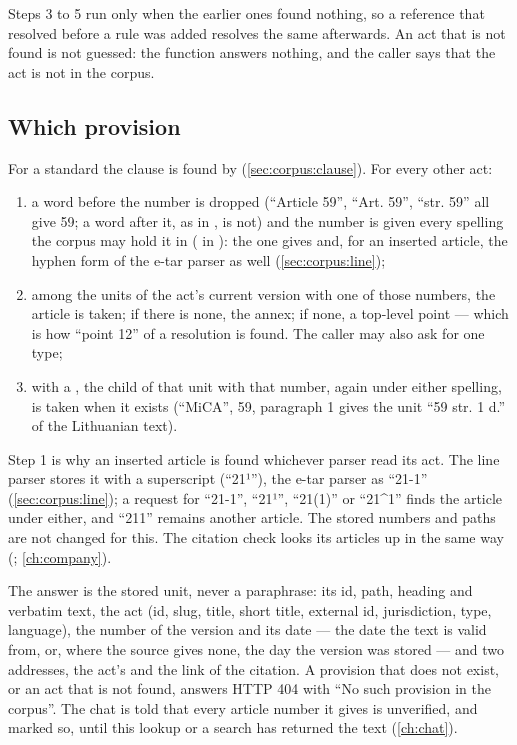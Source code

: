 Steps 3 to 5 run only when the earlier ones found nothing, so a reference that resolved
before a rule was added resolves the same afterwards. An act that is not found is not
guessed: the function answers nothing, and the caller says that the act is not in the corpus.

\subsection{Which provision}\label{sec:corpus:whichprovision}

For a standard the clause is found by  (\cref{sec:corpus:clause}). For
every other act:

\begin{enumerate}
  \item a word before the number is dropped (\enquote{Article 59}, \enquote{Art. 59},
    \enquote{str. 59} all give 59; a word after it, as in , is not) and the
    number is given every spelling the corpus may hold it in ( in
    ): the one  gives and, for an inserted
    article, the hyphen form of the e-tar parser as well (\cref{sec:corpus:line});
  \item among the units of the act's current version with one of those numbers, the article is
    taken; if there is none, the annex; if none, a top-level point --- which is how
    \enquote{point 12} of a resolution is found. The caller may also ask for one type;
  \item with a , the child of that unit with that number, again under either
    spelling, is taken when it
    exists (\enquote{MiCA}, 59, paragraph 1 gives the unit \enquote{59 str. 1 d.} of the
    Lithuanian text).
\end{enumerate}

Step 1 is why an inserted article is found whichever parser read its act. The line parser
stores it with a superscript (\enquote{21¹}), the e-tar parser as \enquote{21-1}
(\cref{sec:corpus:line}); a request for \enquote{21-1}, \enquote{21¹}, \enquote{21(1)} or
\enquote{21\textasciicircum 1} finds the article under either, and \enquote{211} remains
another article. The stored numbers and paths are not changed for this. The citation check
looks its articles up in the same way (; \cref{ch:company}).

The answer is the stored unit, never a paraphrase: its id, path, heading and verbatim text,
the act (id, slug, title, short title, external id, jurisdiction, type, language), the number
of the version and its date --- the date the text is valid from, or, where the source gives
none, the day the version was stored --- and two addresses, the act's  and
the link of the citation. A provision that does not exist, or an act that is not found, answers HTTP 404 with
\enquote{No such provision in the corpus}. The chat is told that every article number it gives
is unverified, and marked so, until this lookup or a search has returned the text
(\cref{ch:chat}).

